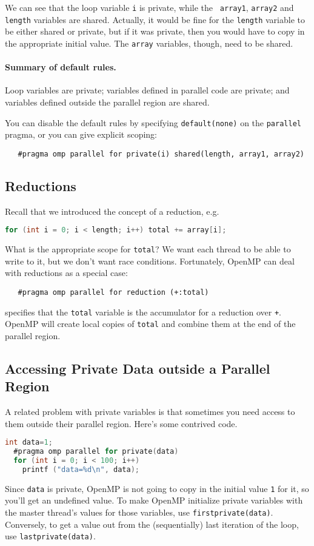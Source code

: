 We can see that the loop variable {\tt i} is private, while the {\tt
  array1}, {\tt array2} and {\tt length} variables are shared.
Actually, it would be fine for the {\tt length} variable to be either
shared or private, but if it was private, then you would have to copy
in the appropriate initial value. The {\tt array} variables, though, 
need to be shared.

\paragraph{Summary of default rules.} Loop variables are private; 
variables defined in parallel code are private; and variables defined
outside the parallel region are shared.

You can disable the default rules by specifying {\tt default(none)}
on the {\tt parallel} pragma, or you can give explicit scoping:

\verb+   #pragma omp parallel for private(i) shared(length, array1, array2)+

\subsection*{Reductions}
Recall that we introduced the concept of a reduction, e.g.
{\small
\begin{lstlisting}[language=C,morekeywords={foreach,pragma,omp,parallel,single,nowait,task,untied,barrier,taskyield}]
  for (int i = 0; i < length; i++) total += array[i];
\end{lstlisting}
}
What is the appropriate scope for {\tt total}? We want each thread
to be able to write to it, but we don't want race conditions.
Fortunately, OpenMP can deal with reductions as a special case:

\verb!   #pragma omp parallel for reduction (+:total)!

\noindent
specifies that the {\tt total} variable is the accumulator for a
reduction over {\tt +}. OpenMP will create local copies of {\tt total} and 
combine them at the end of the parallel region.

\subsection*{Accessing Private Data outside a Parallel Region}
A related problem with private variables is that sometimes you need 
access to them outside their parallel region. Here's some contrived code.

{\small
\begin{lstlisting}[language=C,morekeywords={foreach,pragma,omp,parallel,single,nowait,task,untied,barrier,taskyield}]
  int data=1;
  #pragma omp parallel for private(data)
  for (int i = 0; i < 100; i++)
    printf ("data=%d\n", data);
\end{lstlisting}
}
Since {\tt data} is private, OpenMP is not going to copy in the
initial value {\tt 1} for it, so you'll get an undefined value.  To
make OpenMP initialize private variables with the master thread's
values for those variables, use {\tt firstprivate(data)}.  Conversely,
to get a value out from the (sequentially) last iteration of the loop,
use {\tt lastprivate(data)}.

